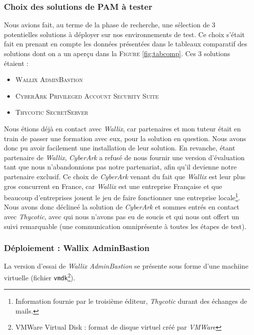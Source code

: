 \subsubsection{Choix des solutions de PAM à tester}
\label{par:choixsol}

Nous avions fait, au terme de la phase de recherche, une sélection de 3 potentielles solutions à déployer sur nos environnements de test. Ce choix s'était fait en prenant en compte les données présentées dans le tableaux comparatif des solutions dont on a un aperçu dans la \textsc{Figure} \ref{fig:tabcomp}. Ces 3 solutions étaient :
\begin{itemize}
	\item \textsc{Wallix AdminBastion}
	\item \textsc{CyberArk Privileged Account Security Suite}
	\item \textsc{Thycotic SecretServer}
\end{itemize}

Nous étions déjà en contact avec \emph{Wallix}, car partenaires et mon tuteur était en train de passer une formation avec eux, pour la solution en question. Nous avons donc pu avoir facilement une installation de leur solution. En revanche, étant partenaire de \emph{Wallix}, \emph{CyberArk} a refusé de nous fournir une version d'évaluation tant que nous n'abandonnions pas notre partenariat, afin qu'il devienne notre partenaire exclusif. Ce choix de \emph{CyberArk} venant du fait que \emph{Wallix} est leur plus gros concurrent en France, car \emph{Wallix} est une entreprise Française et que beaucoup d'entreprises jouent le jeu de faire fonctionner une entreprise locale\footnote{Information fournie par le troisième éditeur, \emph{Thycotic} durant des échanges de mails.}. Nous avons donc déclineé la solution de \emph{CyberArk} et sommes entrés en contact avec \emph{Thycotic}, avec qui nous n'avons pas eu de soucis et qui nous ont offert un suivi remarquable (une communication omniprésente à toutes les étapes de test).

\subsubsection{Déploiement : Wallix AdminBastion}
\label{par:wallix}

La version d'essai de \emph{Wallix AdminBastion} se présente sous forme d'une machiine virtuelle (fichier \texttt{vmdk}\footnote{VMWare Virtual Disk : format de disque virtuel créé par \emph{VMWare}}).